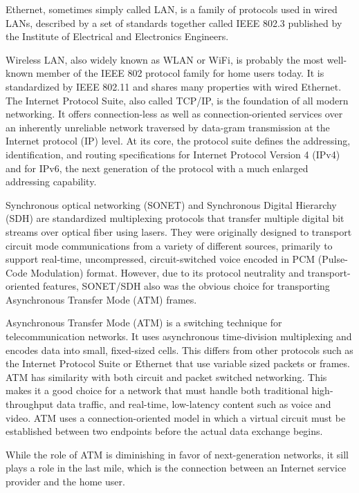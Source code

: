 \documentclass[a4paper]{article}
\begin{document}
\begin{enumerate}[label={\textbf{\Roman*.}},leftmargin=0pt,itemindent=*]
    Ethernet, sometimes simply called LAN, is a family of protocols used in
    wired LANs, described by a set of standards together called IEEE 802.3
    published by the Institute of Electrical and Electronics Engineers.

    Wireless LAN, also widely known as WLAN or WiFi, is probably the most
    well-known member of the IEEE 802 protocol family for home users today. It
    is standardized by IEEE 802.11 and shares many properties with wired
    Ethernet. The Internet Protocol Suite, also called TCP/IP, is the foundation
    of all modern networking. It offers connection-less as well as
    connection-oriented services over an inherently unreliable network traversed
    by data-gram transmission at the Internet protocol (IP) level. At its core,
    the protocol suite defines the addressing, identification, and routing
    specifications for Internet Protocol Version 4 (IPv4) and for IPv6, the next
    generation of the protocol with a much enlarged addressing capability.

    Synchronous optical networking (SONET) and Synchronous Digital Hierarchy
    (SDH) are standardized multiplexing protocols that transfer multiple digital
    bit streams over optical fiber using lasers. They were originally designed
    to transport circuit mode communications from a variety of different
    sources, primarily to support real-time, uncompressed, circuit-switched voice
    encoded in PCM (Pulse-Code Modulation) format. However, due to its protocol
    neutrality and transport-oriented features, SONET/SDH also was the obvious
    choice for transporting Asynchronous Transfer Mode (ATM) frames.

    Asynchronous Transfer Mode (ATM) is a switching technique for
    telecommunication networks. It uses asynchronous time-division multiplexing
    and encodes data into small, fixed-sized cells. This differs from other
    protocols such as the Internet Protocol Suite or Ethernet that use variable
    sized packets or frames. ATM has similarity with both circuit and packet
    switched networking. This makes it a good choice for a network that must
    handle both traditional high-throughput data traffic, and real-time,
    low-latency content such as voice and video. ATM uses a connection-oriented
    model in which a virtual circuit must be established between two endpoints
    before the actual data exchange begins.

    While the role of ATM is diminishing in favor of next-generation networks,
    it sill plays a role in the last mile, which is the connection between an
    Internet service provider and the home user.


\end{enumerate}
\end{document}
